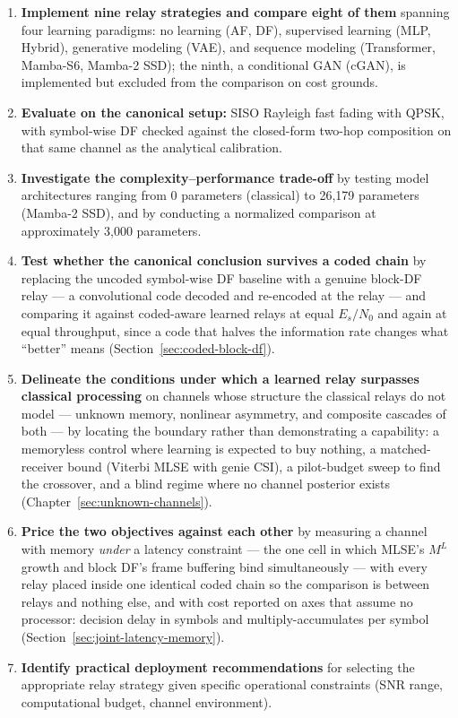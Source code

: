 \begin{enumerate}
\def\labelenumi{\arabic{enumi}.}
\item
  \textbf{Implement nine relay strategies and compare eight of them} spanning four learning paradigms: no learning (AF, DF), supervised learning (MLP, Hybrid), generative modeling (VAE), and sequence modeling (Transformer, Mamba-S6, Mamba-2 SSD); the ninth, a conditional GAN (cGAN), is implemented but excluded from the comparison on cost grounds.
\item
  \textbf{Evaluate on the canonical setup:} SISO Rayleigh fast fading with QPSK, with symbol-wise DF checked against the closed-form two-hop composition on that same channel as the analytical calibration.
\item
  \textbf{Investigate the complexity--performance trade-off} by testing model architectures ranging from 0 parameters (classical) to 26,179 parameters (Mamba-2 SSD), and by conducting a normalized comparison at approximately 3,000 parameters.
\item
  \textbf{Test whether the canonical conclusion survives a coded chain} by replacing the uncoded symbol-wise DF baseline with a genuine block-DF relay --- a convolutional code decoded and re-encoded at the relay --- and comparing it against coded-aware learned relays at equal $E_s/N_0$ and again at equal throughput, since a code that halves the information rate changes what ``better'' means (Section~\ref{sec:coded-block-df}).
\item
  \textbf{Delineate the conditions under which a learned relay surpasses classical processing} on channels whose structure the classical relays do not model --- unknown memory, nonlinear asymmetry, and composite cascades of both --- by locating the boundary rather than demonstrating a capability: a memoryless control where learning is expected to buy nothing, a matched-receiver bound (Viterbi MLSE with genie CSI), a pilot-budget sweep to find the crossover, and a blind regime where no channel posterior exists (Chapter~\ref{sec:unknown-channels}).
\item
  \textbf{Price the two objectives against each other} by measuring a channel with memory \emph{under} a latency constraint --- the one cell in which MLSE's $M^{L}$ growth and block DF's frame buffering bind simultaneously --- with every relay placed inside one identical coded chain so the comparison is between relays and nothing else, and with cost reported on axes that assume no processor: decision delay in symbols and multiply-accumulates per symbol (Section~\ref{sec:joint-latency-memory}).
\item
  \textbf{Identify practical deployment recommendations} for selecting the appropriate relay strategy given specific operational constraints (SNR range, computational budget, channel environment).
\end{enumerate}

